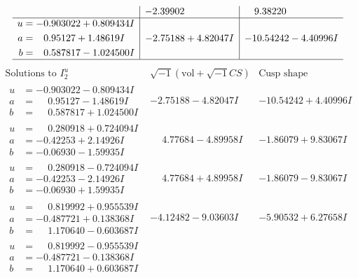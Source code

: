 \documentclass[1p]{elsarticle_modified}
\theoremstyle{definition}
\newcommand{\I}{\sqrt{-1}}
\begin{document}
$$\begin{array}{c|c|c}
 & -2.39902\phantom{ +0.000000I} & \phantom{-}9.38220\phantom{ +0.000000I} \\ \hline\begin{aligned}
u &= -0.903022 + 0.809434 I \\
a &= \phantom{-}0.95127 + 1.48619 I \\
b &= \phantom{-}0.587817 - 1.024500 I\end{aligned}
 & -2.75188 + 4.82047 I & -10.54242 - 4.40996 I\\
 \hline 
 \end{array}$$\newpage$$\begin{array}{c|c|c}  
\text{Solutions to }I^u_{2}& \I (\text{vol} + \sqrt{-1}CS) & \text{Cusp shape}\\
 \hline 
\begin{aligned}
u &= -0.903022 - 0.809434 I \\
a &= \phantom{-}0.95127 - 1.48619 I \\
b &= \phantom{-}0.587817 + 1.024500 I\end{aligned}
 & -2.75188 - 4.82047 I & -10.54242 + 4.40996 I \\ \hline\begin{aligned}
u &= \phantom{-}0.280918 + 0.724094 I \\
a &= -0.42253 + 2.14926 I \\
b &= -0.06930 - 1.59935 I\end{aligned}
 & \phantom{-}4.77684 - 4.89958 I & -1.86079 + 9.83067 I \\ \hline\begin{aligned}
u &= \phantom{-}0.280918 - 0.724094 I \\
a &= -0.42253 - 2.14926 I \\
b &= -0.06930 + 1.59935 I\end{aligned}
 & \phantom{-}4.77684 + 4.89958 I & -1.86079 - 9.83067 I \\ \hline\begin{aligned}
u &= \phantom{-}0.819992 + 0.955539 I \\
a &= -0.487721 + 0.138368 I \\
b &= \phantom{-}1.170640 - 0.603687 I\end{aligned}
 & -4.12482 - 9.03603 I & -5.90532 + 6.27658 I \\ \hline\begin{aligned}
u &= \phantom{-}0.819992 - 0.955539 I \\
a &= -0.487721 - 0.138368 I \\
b &= \phantom{-}1.170640 + 0.603687 I\end{aligned}

\end{array}$$
\end{document}
